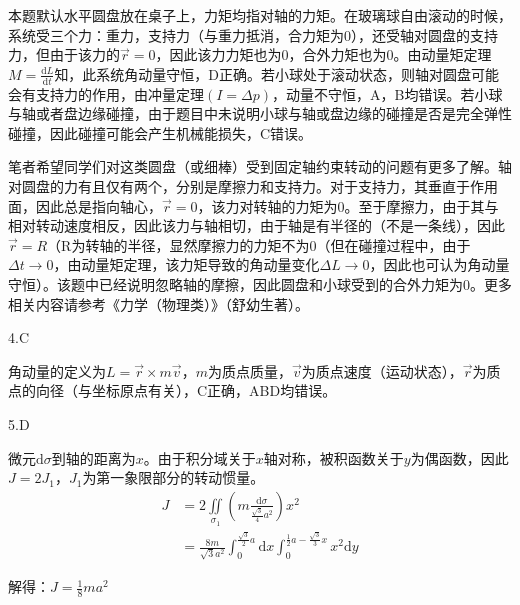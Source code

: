 \documentclass[blue, normal]{./templete/qyxfnote}
\newcommand{\di}[1]{\mathrm{d}#1}
\newcommand{\dy}[2]{\frac{\di{#1}}{\di{#2}}}
\newcommand{\zbj}[4]
{
	\draw (0,0) node[below left] {$ O $};
	\draw [->] (#1,0) -- (#2,0) node[right] {$ x $};
	\draw [->] (0,#3) -- (0,#4) node[right] {$ y $};
}
\begin{document}
\begin{multicols}{2}
			本题默认水平圆盘放在桌子上，力矩均指对轴的力矩。在玻璃球自由滚动的时候，系统受三个力：重力，支持力（与重力抵消，合力矩为0），还受轴对圆盘的支持力，但由于该力的$ \vec{r}=0 $，因此该力力矩也为0，合外力矩也为0。由动量矩定理$ M=\dy{L}{t} $知，此系统角动量守恒，D正确。若小球处于滚动状态，则轴对圆盘可能会有支持力的作用，由冲量定理$ (I=\Delta p) $，动量不守恒，A，B均错误。若小球与轴或者盘边缘碰撞，由于题目中未说明小球与轴或盘边缘的碰撞是否是完全弹性碰撞，因此碰撞可能会产生机械能损失，C错误。\\
			\begin{note}
			笔者希望同学们对这类圆盘（或细棒）受到固定轴约束转动的问题有更多了解。轴对圆盘的力有且仅有两个，分别是摩擦力和支持力。对于支持力，其垂直于作用面，因此总是指向轴心，$ \vec{r}=0 $，该力对转轴的力矩为0。至于摩擦力，由于其与相对转动速度相反，因此该力与轴相切，由于轴是有半径的（不是一条线），因此$ \vec{r}=R $（R为转轴的半径，显然摩擦力的力矩不为0（但在碰撞过程中，由于$ \Delta t\to 0 $，由动量矩定理，该力矩导致的角动量变化$ \Delta L\to 0 $，因此也可认为角动量守恒）。该题中已经说明忽略轴的摩擦，因此圆盘和小球受到的合外力矩为0。更多相关内容请参考《力学（物理类）》（舒幼生著）。
			\end{note}
			
			4.C
			
			角动量的定义为$ L=\vec{r}\times m\vec{v} $，$ m $为质点质量，$ \vec{v} $为质点速度（运动状态），$ \vec{r} $为质点的向径（与坐标原点有关），C正确，ABD均错误。
			
			5.D
		
			\par
			微元$ \di{\sigma} $到轴的距离为$ x $。由于积分域关于$ x $轴对称，被积函数关于$ y $为偶函数，因此$ J=2J_1 $，$ J_1 $为第一象限部分的转动惯量。
			\begin{align*}
			J&=2\iint\limits_{\sigma_1}\left(m\frac{\di{\sigma}}{\frac{\sqrt{3}}{4}a^2}\right)x^2\\
			&=\frac{8m}{\sqrt{3}a^2}\int_0^{\frac{\sqrt{3}}{2}a}\di{x}\int_0^{\frac{1}{2}a-\frac{\sqrt{3}}{3}x}x^2\di{y}
			\end{align*}\par
			解得：$ J=\frac{1}{8}ma^2 $
			

\end{multicols}
\end{document}

